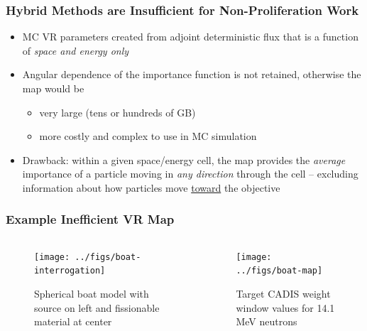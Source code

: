 \documentclass[xcolor=x11names,compress]{beamer}
\renewcommand{\(}{\begin{columns}}
\renewcommand{\)}{\end{columns}}
\newcommand{\<}[1]{\begin{column}{#1}}
\renewcommand{\>}{\end{column}}
\begin{document}
\begin{frame}[fragile]
  \frametitle{Hybrid Methods are Insufficient for Non-Proliferation Work}

	\begin{itemize}
	\item MC VR parameters created from adjoint deterministic flux that is a
	      function of \emph{space and energy only}
	\item Angular dependence of the importance function is not retained, otherwise
	      the map would be
	  \begin{itemize}
	  \item very large (tens or hundreds of GB)
	  \item more costly and complex to use in MC simulation
      \end{itemize}	   
      \vspace*{1 em}
	\item Drawback: within a given space/energy cell, the map provides the
	      \emph{average} importance of a particle moving in \emph{any direction}
	      through the cell -- excluding information about how particles move
	      \underline{toward} the objective
	\end{itemize}

\end{frame}

\begin{frame}[fragile]
  \frametitle{Example Inefficient VR Map \cite{Peplow2012}}

	\begin{columns}
  	\begin{column}{0.5\textwidth}
 	 \begin{center}
 	 \begin{figure}
 	 \texttt{[image: ../figs/boat-interrogation]}  
 	 \caption{Spherical boat model with source on left and fissionable material at center}
 	 \end{figure}
 	 \end{center}
  	\end{column}
 	\begin{column}{0.5\textwidth}
 	 \begin{center}
 	 \begin{figure}
 	 \texttt{[image: ../figs/boat-map]}  
 	 \caption{Target CADIS weight window values for 14.1 MeV neutrons}
 	 \end{figure}
 	 \end{center}
  	\end{column}
	\end{columns}

\end{frame}
\end{document}
